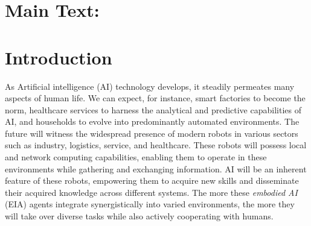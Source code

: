 \documentclass[12pt]{article}
\renewcommand{\emph}[1]{\textit{#1}}
\begin{document}

\newcommand{\beginsupplement}
{%
	\setcounter{table}{0}
	\renewcommand{\thesection}{S\arabic{section}}
	\renewcommand{\thetable}{S\arabic{table}}%
	\setcounter{figure}{0}
	\renewcommand{\thefigure}{S\arabic{figure}}%
}


\section*{Main Text:}

\section*{Introduction}\label{sec:intro}
As Artificial intelligence (AI) technology develops, it steadily permeates many aspects of human life. We can expect, for instance, smart factories to become the norm, healthcare services to harness the analytical and predictive capabilities of AI, and households to evolve into predominantly automated environments. The future will witness the widespread presence of modern robots in various sectors such as industry, logistics, service, and healthcare. These robots will possess local and network computing capabilities, enabling them to operate in these environments while gathering and exchanging information. AI will be an inherent feature of these robots, empowering them to acquire new skills and disseminate their acquired knowledge across different systems. The more these \emph{embodied AI} (EIA) agents integrate synergistically into varied environments, the more they will take over diverse tasks while also actively cooperating with humans.
\end{document}

